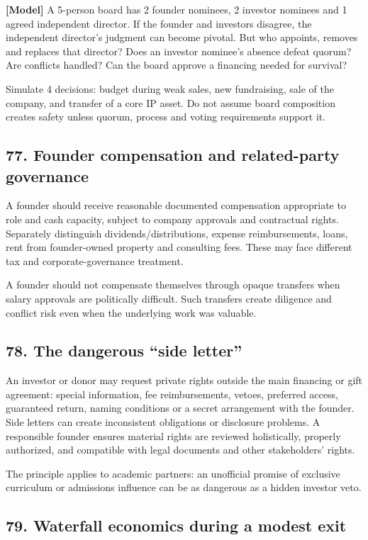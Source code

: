 \textbf{[Model]} A 5-person board has 2 founder nominees, 2 investor nominees and 1 agreed independent director. If the founder and investors disagree, the independent director's judgment can become pivotal. But who appoints, removes and replaces that director? Does an investor nominee's absence defeat quorum? Are conflicts handled? Can the board approve a financing needed for survival?

Simulate 4 decisions: budget during weak sales, new fundraising, sale of the company, and transfer of a core IP asset. Do not assume board composition creates safety unless quorum, process and voting requirements support it.

\subsection{77. Founder compensation and related-party governance}

A founder should receive reasonable documented compensation appropriate to role and cash capacity, subject to company approvals and contractual rights. Separately distinguish dividends/distributions, expense reimbursements, loans, rent from founder-owned property and consulting fees. These may face different tax and corporate-governance treatment.

A founder should not compensate themselves through opaque transfers when salary approvals are politically difficult. Such transfers create diligence and conflict risk even when the underlying work was valuable.

\subsection{78. The dangerous ``side letter''}

An investor or donor may request private rights outside the main financing or gift agreement: special information, fee reimbursements, vetoes, preferred access, guaranteed return, naming conditions or a secret arrangement with the founder. Side letters can create inconsistent obligations or disclosure problems. A responsible founder ensures material rights are reviewed holistically, properly authorized, and compatible with legal documents and other stakeholders' rights.

The principle applies to academic partners: an unofficial promise of exclusive curriculum or admissions influence can be as dangerous as a hidden investor veto.

\subsection{79. Waterfall economics during a modest exit}

